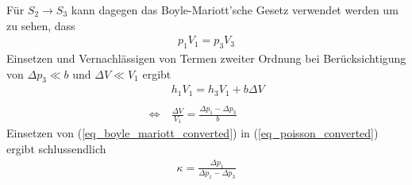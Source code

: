 \documentclass[12pt,a4paper,german]{scrartcl}
\numberwithin{equation}{section}
\begin{document}
  Für $S_2 \rightarrow S_3$ kann dagegen das Boyle-Mariott'sche Gesetz verwendet werden um zu sehen, dass
  \begin{align}
    p_1 V_1 = p_3 V_3
    \label{eq_theo_boyle_mariott}
  \end{align}
  Einsetzen und Vernachlässigen von Termen zweiter Ordnung bei Berücksichtigung von $\Delta p_3 \ll b$ und $\Delta V \ll V_1$ ergibt
  \begin{align}
    &h_1 V_1 = h_3 V_1 + b \Delta V \nonumber \\
    \nonumber \\
    \Leftrightarrow \ &\frac{\Delta V}{V_1} = \frac{\Delta p_1 - \Delta p_3}{b}
    \label{eq_boyle_mariott_converted}
  \end{align}
  Einsetzen von (\ref{eq_boyle_mariott_converted}) in (\ref{eq_poisson_converted}) ergibt schlussendlich
  \begin{align}
    \kappa = \frac{\Delta p_1}{\Delta p_1 - \Delta p_3}
    \label{eq_theo_kappa_clement_desormes}
  \end{align}
\end{document}
